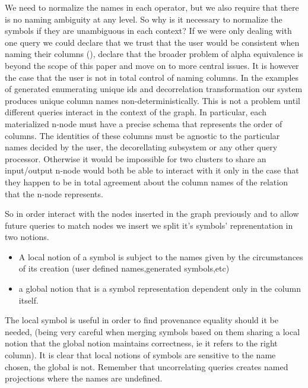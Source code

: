 We need to normalize the names in each operator, but we also require
that there is no naming ambiguity at any level. So why is it necessary
to normalize the symbols if they are unambiguous in each context? If
we were only dealing with one query we could declare that we trust
that the user would be consistent when naming their columns (), declare that the broader problem of alpha
equivalence is beyond the scope of this paper and move on to more
central issues. It is however the case that the user is not in total
control of naming columns. In the examples of generated enumerating
unique ids and decorrelation transformation our system produces unique
column names non-deterministically. This is not a problem until
different queries interact in the context of the graph. In particular,
each materialized n-node must have a precise schema that represents
the order of columns. The identities of these columns must be agnostic
to the particular names decided by the user, the decorellating
subsystem or any other query processor. Otherwise it would be
impossible for two clusters to share an input/output n-node would both
be able to interact with it only in the case that they happen to be in
total agreement about the column names of the relation that the n-node
represents.

So in order interact with the nodes inserted in the graph
previously and to allow future queries to match nodes we insert we
split it's symbols' reprenentation in two notions.

\begin{itemize}
\item A local notion of a symbol is subject to the names given by the
  circumstances of its creation (user defined names,generated
  symbols,etc)
\item a global notion that is a symbol representation dependent only in
  the column itself.
\end{itemize}

The local symbol is useful in order to find provenance equality
should it be needed, (being very careful when merging symbols based
on them sharing a local notion that the global notion maintains
correctness, ie it refers to the right column). It is clear that
local notions of symbols are sensitive to the name chosen, the
global is not. Remember that uncorrelating queries creates named
projections where the names are undefined.

